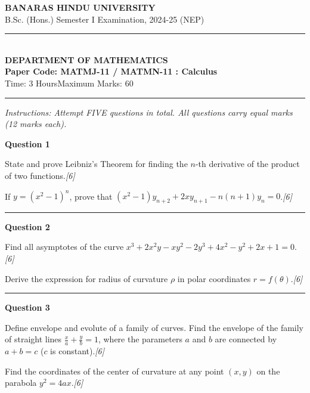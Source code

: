 \documentclass[11pt,a4paper]{article}
\newcommand{\pts}[1]{\hfill   \textit{[#1]}}
\begin{document}
\begin{center}
  {\large\bfseries BANARAS HINDU UNIVERSITY}\\[2pt]
  {\normalsize B.Sc. (Hons.) Semester I Examination, 2024-25 (NEP)}\\[6pt]
  \rule{0.8\linewidth}{0.5pt}\\[6pt]
  {\large\bfseries DEPARTMENT OF MATHEMATICS}\\[4pt]
  {\large\bfseries Paper Code: MATMJ-11 / MATMN-11 : Calculus}\\[4pt]
  {\normalsize Time: 3 Hours\hfill Maximum Marks: 60}
\end{center}

\rule{\linewidth}{0.4pt}\smallskip



\noindent   \textit{Instructions: Attempt FIVE questions in total. All questions carry equal marks (12 marks each).}
\bigskip




\noindent   \textbf{Question 1}

\begin{parts}
  \item State and prove Leibniz's Theorem for finding the $n$-th derivative of the product of two functions.\pts{6}
  \item If $y = (x^2 - 1)^n$, prove that $(x^2 - 1) y_{n+2} + 2x y_{n+1} - n(n+1) y_n = 0$.\pts{6}
\end{parts}

\medskip\rule{\linewidth}{0.2pt}\medskip




\noindent   \textbf{Question 2}

\begin{parts}
  \item Find all asymptotes of the curve $x^3 + 2x^2 y - x y^2 - 2y^3 + 4x^2 - y^2 + 2x + 1 = 0$.\pts{6}
  \item Derive the expression for radius of curvature $\rho$ in polar coordinates $r = f( \theta)$.\pts{6}
\end{parts}

\medskip\rule{\linewidth}{0.2pt}\medskip




\noindent   \textbf{Question 3}

\begin{parts}
  \item Define envelope and evolute of a family of curves. Find the envelope of the family of straight lines $\frac{x}{a} + \frac{y}{b} = 1$, where the parameters $a$ and $b$ are connected by $a + b = c$ ($c$ is constant).\pts{6}
  \item Find the coordinates of the center of curvature at any point $(x, y)$ on the parabola $y^2 = 4ax$.\pts{6}
\end{parts}
\end{document}
